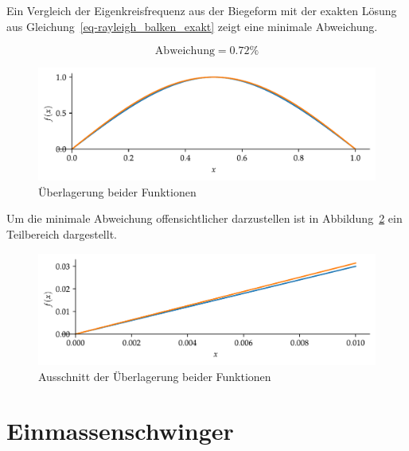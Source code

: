 \documentclass[
  letterpaper,
  DIV=11]{scrreprt}
\begin{document}
Ein Vergleich der Eigenkreisfrequenz aus der Biegeform mit der exakten
Lösung aus Gleichung~\ref{eq-rayleigh_balken_exakt} zeigt eine minimale
Abweichung.

\begin{equation}\text{Abweichung} = 0.72 \%\end{equation}

\begin{figure}[H]

{\centering \includegraphics{index_files/mediabag/rayleigh_03_files/figure-pdf/fig-formfunktion_vergleich-output-1.pdf}

}

\caption{\label{fig-formfunktion_vergleich}Überlagerung beider
Funktionen}

\end{figure}

Um die minimale Abweichung offensichtlicher darzustellen ist in
Abbildung~\ref{fig-ausschnitt_formfunktion_vergleich} ein Teilbereich
dargestellt.

\begin{figure}[H]

{\centering \includegraphics{index_files/mediabag/rayleigh_03_files/figure-pdf/fig-ausschnitt_formfunktion_vergleich-output-1.pdf}

}

\caption{\label{fig-ausschnitt_formfunktion_vergleich}Ausschnitt der
Überlagerung beider Funktionen}

\end{figure}

\part{Einmassenschwinger}
\end{document}
